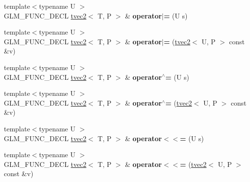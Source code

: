 \begin{DoxyCompactItemize}
\item 
{\footnotesize template$<$typename U $>$ }\\G\+L\+M\+\_\+\+F\+U\+N\+C\+\_\+\+D\+E\+CL \hyperlink{structglm_1_1detail_1_1tvec2}{tvec2}$<$ T, P $>$ \& {\bfseries operator$\vert$=} (U s)\hypertarget{structglm_1_1detail_1_1tvec2_a62015e8977847b4c13e0dd396802a5b0}{}\label{structglm_1_1detail_1_1tvec2_a62015e8977847b4c13e0dd396802a5b0}

\item 
{\footnotesize template$<$typename U $>$ }\\G\+L\+M\+\_\+\+F\+U\+N\+C\+\_\+\+D\+E\+CL \hyperlink{structglm_1_1detail_1_1tvec2}{tvec2}$<$ T, P $>$ \& {\bfseries operator$\vert$=} (\hyperlink{structglm_1_1detail_1_1tvec2}{tvec2}$<$ U, P $>$ const \&v)\hypertarget{structglm_1_1detail_1_1tvec2_aea5cce6a904468eb31c039643a18c9af}{}\label{structglm_1_1detail_1_1tvec2_aea5cce6a904468eb31c039643a18c9af}

\item 
{\footnotesize template$<$typename U $>$ }\\G\+L\+M\+\_\+\+F\+U\+N\+C\+\_\+\+D\+E\+CL \hyperlink{structglm_1_1detail_1_1tvec2}{tvec2}$<$ T, P $>$ \& {\bfseries operator$^\wedge$=} (U s)\hypertarget{structglm_1_1detail_1_1tvec2_a5275bd243c23d0898f39e094da95b2a1}{}\label{structglm_1_1detail_1_1tvec2_a5275bd243c23d0898f39e094da95b2a1}

\item 
{\footnotesize template$<$typename U $>$ }\\G\+L\+M\+\_\+\+F\+U\+N\+C\+\_\+\+D\+E\+CL \hyperlink{structglm_1_1detail_1_1tvec2}{tvec2}$<$ T, P $>$ \& {\bfseries operator$^\wedge$=} (\hyperlink{structglm_1_1detail_1_1tvec2}{tvec2}$<$ U, P $>$ const \&v)\hypertarget{structglm_1_1detail_1_1tvec2_ad24ddb39053aaf91cbb40610e813fcac}{}\label{structglm_1_1detail_1_1tvec2_ad24ddb39053aaf91cbb40610e813fcac}

\item 
{\footnotesize template$<$typename U $>$ }\\G\+L\+M\+\_\+\+F\+U\+N\+C\+\_\+\+D\+E\+CL \hyperlink{structglm_1_1detail_1_1tvec2}{tvec2}$<$ T, P $>$ \& {\bfseries operator$<$$<$=} (U s)\hypertarget{structglm_1_1detail_1_1tvec2_a4c1990d9dd6b9a617a782c7272a3ba0b}{}\label{structglm_1_1detail_1_1tvec2_a4c1990d9dd6b9a617a782c7272a3ba0b}

\item 
{\footnotesize template$<$typename U $>$ }\\G\+L\+M\+\_\+\+F\+U\+N\+C\+\_\+\+D\+E\+CL \hyperlink{structglm_1_1detail_1_1tvec2}{tvec2}$<$ T, P $>$ \& {\bfseries operator$<$$<$=} (\hyperlink{structglm_1_1detail_1_1tvec2}{tvec2}$<$ U, P $>$ const \&v)\hypertarget{structglm_1_1detail_1_1tvec2_a0b22d5e95e2ecbd4024c04910db325ce}{}\label{structglm_1_1detail_1_1tvec2_a0b22d5e95e2ecbd4024c04910db325ce}


\end{DoxyCompactItemize}
